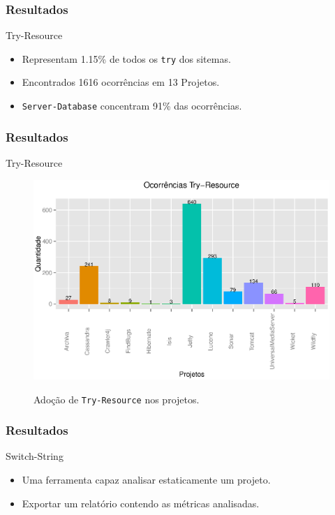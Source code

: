 \documentclass[]{beamer}
\begin{document}
	\begin{frame}[fragile, label=re]\frametitle{Resultados}
		\begin{block}{Try-Resource}
			\begin{itemize}
				\item Representam 1.15\% de todos os \texttt{try} dos sitemas.
			
				\item Encontrados 1616 ocorrências em 13 Projetos.
								
				\item \texttt{Server-Database} concentram 91\% das ocorrências.
			
			\end{itemize}
			
		\end{block}
		
	\end{frame}
	
	\begin{frame}[fragile, label=re]\frametitle{Resultados}
		\begin{block}{Try-Resource}
	
			\begin{figure}[Th]
					\center
					\includegraphics[scale=0.42]{../TCC/Imagens/ocorrenciasTryResource}
					\label{fig:Try-Resource}
					\caption{Adoção de \texttt{Try-Resource} nos projetos.}
			\end{figure}
		\end{block}
	
	\end{frame}
	
	
	
	
	
	
	\begin{frame}[fragile, label=re]\frametitle{Resultados}
		\begin{block}{Switch-String}
			\begin{itemize}
				\item Uma ferramenta capaz analisar estaticamente um projeto.
				
				\item Exportar um relatório contendo as métricas analisadas.
				
			\end{itemize}
		\end{block}
	\end{frame}
\end{document}
